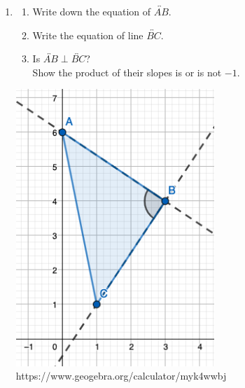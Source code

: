 \begin{enumerate}
\item \begin{multicols}{2}
  \begin{enumerate}
    \item Write down the equation of $\overleftrightarrow{AB}$.
    \item Write the equation of line $\overleftrightarrow{BC}$.
    \item Is $\overleftrightarrow{AB} \perp \overleftrightarrow{BC}$? \\[1cm]
    Show the product of their slopes is or is not $-1$. \\[3cm]
    \end{enumerate}
\columnbreak
    \includegraphics[width=7.5cm]{../graphics/06triangle.png}
    https://www.geogebra.org/calculator/myk4wwbj
\end{multicols}


\end{enumerate}
